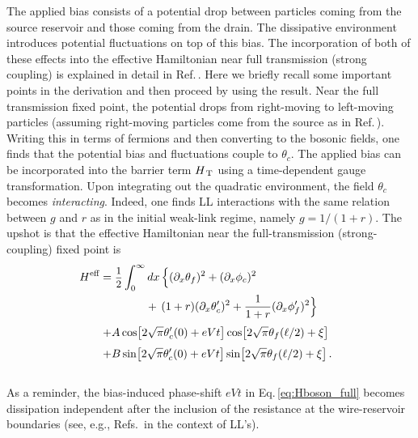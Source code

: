 \documentclass[aps,prb,reprint,floatfix,superscriptaddress,amssymb,amsmath]{revtex4-2}
\newcommand{\HT}{H_\text{\,T}}
\newcommand{\sdfrac}[2]{\mbox{\small$\displaystyle\frac{#1}{#2}$}}
\begin{document}
The applied bias consists of a potential drop between particles coming from the source reservoir and those coming from the drain. The dissipative environment introduces potential fluctuations on top of this bias. The incorporation of both of these effects into the effective Hamiltonian near full transmission (strong coupling) is explained in detail in Ref.\,\cite{ZhangNoneqPRR21}. 
Here we briefly recall some important points in the derivation and then proceed by using the result. Near the full transmission fixed point, the potential drops from right-moving to left-moving particles (assuming right-moving particles come from the source as in Ref.\,\cite{ZhangNoneqPRR21}). 
Writing this in terms of fermions and then converting to the bosonic fields, one finds that the potential bias and fluctuations couple to $\theta_c$. The applied bias can be incorporated into the barrier term $\HT$ using a time-dependent gauge transformation. Upon integrating out the quadratic environment, the field $\theta_c$ becomes \emph{interacting}. Indeed, one finds LL interactions with the same relation between $g$ and $r$ as in the initial weak-link regime, namely $g=1/(1+r)$. The upshot is that the effective Hamiltonian near the full-transmission (strong-coupling) fixed point is 
\begin{subequations}
\begin{align}
\!\!\!\!H^{\text{eff}}  = &\; \sdfrac{1}{2} \int_0^{\infty} dx\, \Big\{ (\partial_x \theta_f)^2 + (\partial_x \phi_c)^2 
\label{eq:H0_strong4a}\\
 &\qquad\quad +\, (1 + r)(\partial_x \theta_c')^2 + \frac{1}{1+ r} (\partial_x \phi_f')^2\Big\} 
\label{eq:H0_strong4b}\\[3pt]
 +& A \cos\!\left[2\sqrt{\pi}\theta_c'(0) + eVt\right] \cos\!\left[ 2\sqrt{\pi}\theta_f(\ell/2) + \xi \right]
\label{eq:HT_boson4a}\\[3pt]
+& B \sin\!\left[2\sqrt{\pi}\theta_c'(0) + eVt\right] \sin\!\left[ 2\sqrt{\pi}\theta_f(\ell/2) + \xi \right] .
\label{eq:HT_boson4b}
\end{align}
\label{eq:Hboson_full}
\end{subequations}\vspace*{-0.2cm}\\
As a reminder, the bias-induced phase-shift $eVt$ in Eq.\,\eqref{eq:Hboson_full} becomes dissipation independent after the inclusion of the resistance at the wire-reservoir boundaries (see, e.g., Refs.\,\cite{PonomarenkoRPB95,SafiSchulzPRB95,MaslovStonePRB95,FrohlichPRB96,HuKaneX16} in the context of LL's).
\end{document}
